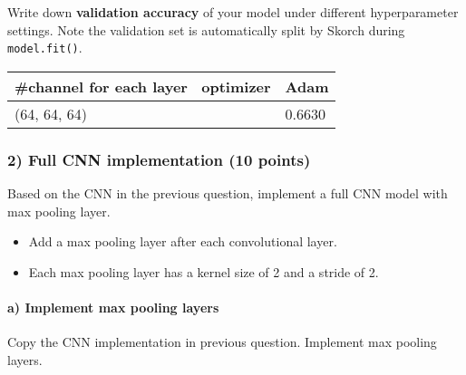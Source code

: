 \documentclass[11pt]{article}
\providecommand{\tightlist}{%
      \setlength{\itemsep}{0pt}\setlength{\parskip}{0pt}}
\begin{document}
    Write down \textbf{validation accuracy} of your model under different
hyperparameter settings. Note the validation set is automatically split
by Skorch during \texttt{model.fit()}.

\begin{longtable}[]{@{}ll@{}}
\toprule
\#channel for each layer ~optimizer & Adam\tabularnewline
\midrule
\endhead
(64, 64, 64) & 0.6630\tabularnewline
\bottomrule
\end{longtable}

    \hypertarget{full-cnn-implementation-10-points}{%
\subsubsection{2) Full CNN implementation (10
points)}\label{full-cnn-implementation-10-points}}

    Based on the CNN in the previous question, implement a full CNN model
with max pooling layer.

\begin{itemize}
\tightlist
\item
  Add a max pooling layer after each convolutional layer.
\item
  Each max pooling layer has a kernel size of 2 and a stride of 2.
\end{itemize}

    

    \hypertarget{a-implement-max-pooling-layers}{%
\paragraph{a) Implement max pooling
layers}\label{a-implement-max-pooling-layers}}

    Copy the CNN implementation in previous question. Implement max pooling
layers.
\end{document}
